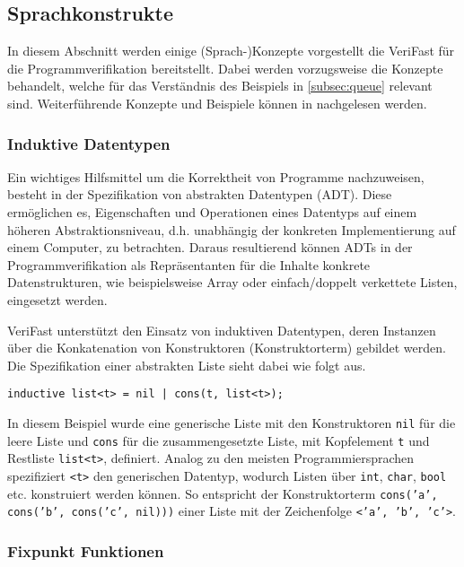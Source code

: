 \subsection{Sprachkonstrukte}

In diesem Abschnitt werden einige (Sprach-)Konzepte vorgestellt die VeriFast für die Programmverifikation bereitstellt. Dabei werden vorzugsweise die Konzepte behandelt, welche für das Verständnis des Beispiels in \cref{subsec:queue} relevant sind. Weiterführende Konzepte und Beispiele können in \cite{Jacobs2017} nachgelesen werden.

\subsubsection{Induktive Datentypen}
\label{subsec:adt}

Ein wichtiges Hilfsmittel um die Korrektheit von Programme nachzuweisen, besteht in der Spezifikation von abstrakten Datentypen (ADT). Diese ermöglichen es, Eigenschaften und Operationen eines Datentyps auf einem höheren Abstraktionsniveau, d.h. unabhängig der konkreten Implementierung auf einem Computer, zu betrachten. Daraus resultierend können ADTs in der Programmverifikation als Repräsentanten für die Inhalte konkrete Datenstrukturen, wie beispielsweise Array oder einfach/doppelt verkettete Listen, eingesetzt werden. \cite[S. 265]{Saake2014}

VeriFast unterstützt den Einsatz von induktiven Datentypen, deren Instanzen über die Konkatenation von Konstruktoren (Konstruktorterm) gebildet werden. Die Spezifikation einer abstrakten Liste sieht dabei wie folgt aus.

\begin{lstlisting}
inductive list<t> = nil | cons(t, list<t>);
\end{lstlisting}

\noindent
In diesem Beispiel wurde eine generische Liste mit den Konstruktoren \texttt{nil} für die leere Liste und \texttt{cons} für die zusammengesetzte Liste, mit Kopfelement \texttt{t} und Restliste \texttt{list<t>}, definiert. Analog zu den meisten Programmiersprachen spezifiziert \texttt{<t>} den generischen Datentyp, wodurch Listen über \texttt{int}, \texttt{char}, \texttt{bool} etc. konstruiert werden können. So entspricht der Konstruktorterm \texttt{cons('a', cons('b', cons('c', nil)))} einer Liste mit der Zeichenfolge \texttt{<'a', 'b', 'c'>}.

\subsubsection{Fixpunkt Funktionen}

